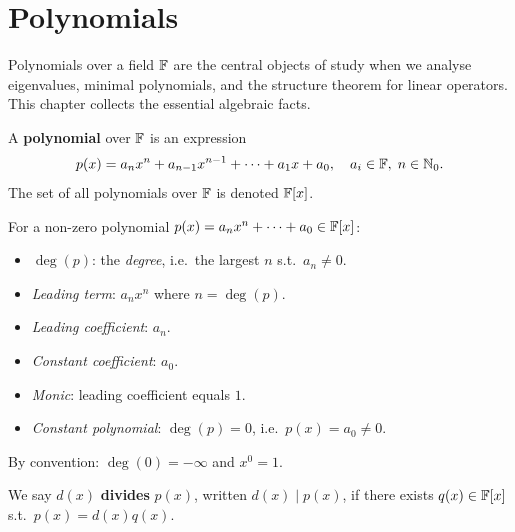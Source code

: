\section{Polynomials}
\label{sec:polynomials}

Polynomials over a field $\mathbb{F}$ are the central objects of study when we analyse
eigenvalues, minimal polynomials, and the structure theorem for linear
operators.  This chapter collects the essential algebraic facts.

\begin{defbox}
A \textbf{polynomial} over $\mathbb{F}$ is an expression
\[
    p(x) = a_n x^n + a_{n-1}x^{n-1} + \cdots + a_1 x + a_0,
    \quad a_i\in\mathbb{F},\; n\in\mathbb{N}_0.
\]
The set of all polynomials over $\mathbb{F}$ is denoted $\mathbb{F}[x]$.
\end{defbox}

\begin{defbox}
For a non-zero polynomial $p(x) = a_n x^n + \cdots + a_0 \in \mathbb{F}[x]$:
\begin{itemize}
    \item $\deg(p)$: the \emph{degree}, i.e.\ the largest $n$ s.t.\ $a_n\neq 0$.
    \item \emph{Leading term}: $a_n x^n$ where $n=\deg(p)$.
    \item \emph{Leading coefficient}: $a_n$.
    \item \emph{Constant coefficient}: $a_0$.
    \item \emph{Monic}: leading coefficient equals $1$.
    \item \emph{Constant polynomial}: $\deg(p)=0$, i.e.\ $p(x)=a_0\neq 0$.
\end{itemize}
By convention: $\deg(0) = -\infty$ and $x^0 = 1$.
\end{defbox}

\begin{defbox}
We say $d(x)$ \textbf{divides} $p(x)$, written $d(x)\mid p(x)$, if there
exists $q(x)\in\mathbb{F}[x]$ s.t.\ $p(x)=d(x)q(x)$.
\end{defbox}

